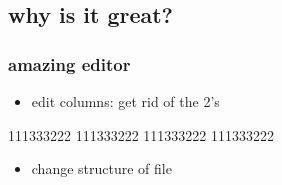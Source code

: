 \documentclass[11pt]{article}
\begin{document}
\subsection*{why is it great?}
\label{sec:org12e3006}
\subsubsection*{amazing editor}
\label{sec:org74aa4cf}
\begin{itemize}
\item edit columns: get rid of the 2's
\end{itemize}

111333222
111333222
111333222
111333222

\begin{itemize}
\item change structure of file
\end{itemize}
\end{document}
